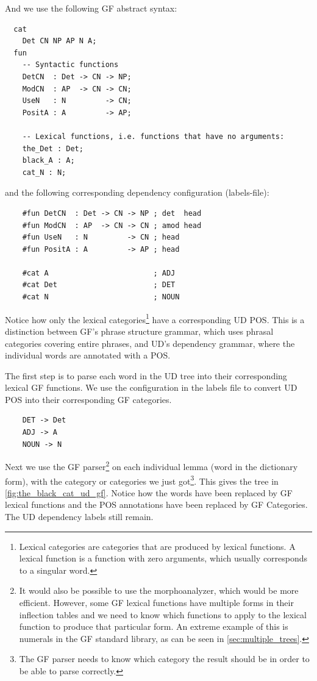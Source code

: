 And we use the following \ac{GF} abstract syntax:

\begin{verbatim}
  cat
    Det CN NP AP N A;
  fun
    -- Syntactic functions
    DetCN  : Det -> CN -> NP;
    ModCN  : AP  -> CN -> CN;
    UseN   : N         -> CN;
    PositA : A         -> AP;

    -- Lexical functions, i.e. functions that have no arguments:
    the_Det : Det;
    black_A : A;
    cat_N : N;
\end{verbatim}
and the following corresponding dependency configuration (labels-file):
\begin{verbatim}
    #fun DetCN  : Det -> CN -> NP ; det  head
    #fun ModCN  : AP  -> CN -> CN ; amod head
    #fun UseN   : N         -> CN ; head
    #fun PositA : A         -> AP ; head

    #cat A                        ; ADJ
    #cat Det                      ; DET
    #cat N                        ; NOUN
\end{verbatim}

Notice how only the lexical categories\footnote{Lexical categories are categories that are produced by lexical functions. A lexical function is a function with zero arguments, which usually corresponds to a singular word.} have a corresponding \ac{UD} \ac{POS}. This is a distinction between \ac{GF}'s phrase structure grammar, which uses phrasal categories covering entire phrases, and \ac{UD}'s dependency grammar, where the individual words are annotated with a \ac{POS}.

The first step is to parse each word in the \ac{UD} tree into their corresponding lexical \ac{GF} functions. We use the configuration in the labels file to convert \ac{UD} \ac{POS} into their corresponding \ac{GF} categories.
\begin{verbatim}
    DET -> Det
    ADJ -> A
    NOUN -> N
\end{verbatim}
Next we use the \ac{GF} parser\footnote{It would also be possible to use the morphoanalyzer, which would be more efficient. However, some \ac{GF} lexical functions have multiple forms in their inflection tables and we need to know which functions to apply to the lexical function to produce that particular form. An extreme example of this is numerals in the \ac{GF} standard library, as can be seen in \autoref{sec:multiple_trees}.} on each individual lemma (word in the dictionary form), with the category or categories we just got\footnote{The \ac{GF} parser needs to know which category the result should be in order to be able to parse correctly.}. %
This gives the tree in \autoref{fig:the_black_cat_ud_gf}. Notice how the words have been replaced by \ac{GF} lexical functions and the \ac{POS} annotations have been replaced by \ac{GF} Categories. The \ac{UD} dependency labels still remain.

